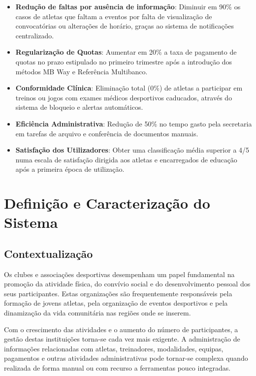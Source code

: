 \documentclass[a4paper,12pt]{scrreprt}
\begin{document}
\begin{itemize}
    \item \textbf{Redução de faltas por ausência de informação}: Diminuir em 90\% os casos de atletas que faltam a eventos por falta de visualização de convocatórias ou alterações de horário, graças ao sistema de notificações centralizado.
    \item \textbf{Regularização de Quotas}: Aumentar em 20\% a taxa de pagamento de quotas no prazo estipulado no primeiro trimestre após a introdução dos métodos MB Way e Referência Multibanco.
    \item \textbf{Conformidade Clínica}: Eliminação total (0\%) de atletas a participar em treinos ou jogos com exames médicos desportivos caducados, através do sistema de bloqueio e alertas automáticos.
    \item \textbf{Eficiência Administrativa}: Redução de 50\% no tempo gasto pela secretaria em tarefas de arquivo e conferência de documentos manuais.
    \item \textbf{Satisfação dos Utilizadores}: Obter uma classificação média superior a 4/5 numa escala de satisfação dirigida aos atletas e encarregados de educação após a primeira época de utilização.
\end{itemize}


\chapter{Definição e Caracterização do Sistema}

\section{Contextualização}
Os clubes e associações desportivas desempenham um papel fundamental na promoção da atividade física, do convívio social e do desenvolvimento pessoal dos seus participantes. Estas organizações são frequentemente responsáveis pela formação de jovens atletas, pela organização de eventos desportivos e pela dinamização da vida comunitária nas regiões onde se inserem.

Com o crescimento das atividades e o aumento do número de participantes, a gestão destas instituições torna-se cada vez mais exigente. A administração de informações relacionadas com atletas, treinadores, modalidades, equipas, pagamentos e outras atividades administrativas pode tornar-se complexa quando realizada de forma manual ou com recurso a ferramentas pouco integradas.
\end{document}
